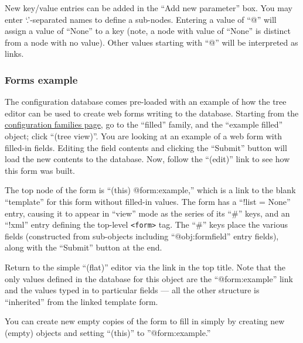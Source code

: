 \documentclass[12pt,english]{article}
\begin{document}
New key/value entries can be added in the ``Add new parameter'' box.
You may enter `.'-separated names to define a sub-nodes.
Entering a value of ``@'' will assign a value of ``None'' to a key
	(note, a node with value of ``None'' is distinct from a node with no value).
Other values starting with ``@'' will be interpreted as links.

%
\subsubsection{Forms example}

The configuration database comes pre-loaded with an example of how the tree editor can be used to create web forms writing to the database.
Starting from the \href{http://localhost:8001/cgi-config/ConfigWebManager.py}{configuration families page},
	go to the ``filled'' family, and the ``example filled'' object; click ``(tree view)''.
You are looking at an example of a web form with filled-in fields.
Editing the field contents and clicking the ``Submit'' button will load the new contents to the database.
Now, follow the ``(edit)'' link to see how this form was built.

The top node of the form is ``(this) @form:example,'' which is a link to the blank ``template'' for this form
	without filled-in values.
The form has a ``!list = None'' entry, causing it to appear in ``view'' mode as the series of its ``\#'' keys,
	and an ``!xml'' entry defining the top-level \verb#<form># tag.
The ``\#'' keys place the various fields (constructed from sub-objects including ``@obj:formfield'' entry fields),
	along with the ``Submit'' button at the end.

Return to the simple ``(flat)'' editor via the link in the top title.
Note that the only values defined in the database for this object are the ``@form:example'' link
	and the values typed in to particular fields --- all the other structure is ``inherited''
	from the linked template form.

You can create new empty copies of the form to fill in simply by creating new (empty) objects
	and setting ``(this)'' to ''@form:example.''
\end{document}
